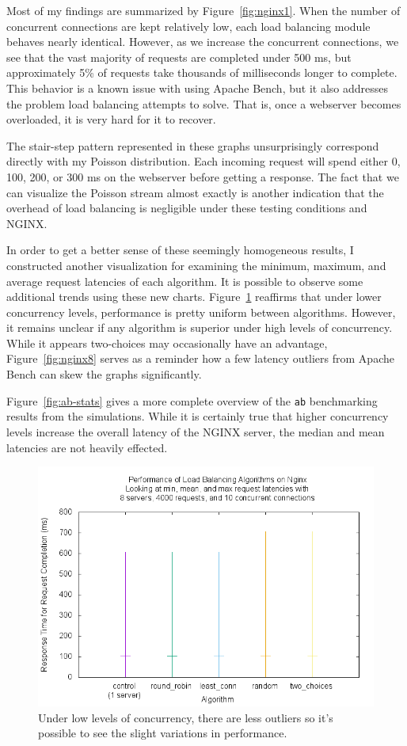 Most of my findings are summarized by Figure~\ref{fig:nginx1}. When
the number of concurrent connections are kept relatively low, each
load balancing module behaves nearly identical. However, as we
increase the concurrent connections, we see that the vast majority of
requests are completed under 500 ms, but approximately 5\% of requests
take thousands of milliseconds longer to complete. This behavior is a
known issue with using Apache Bench, but it also addresses the problem
load balancing attempts to solve. That is, once a webserver becomes
overloaded, it is very hard for it to recover.

The stair-step pattern represented in these graphs unsurprisingly
correspond directly with my Poisson distribution. Each incoming
request will spend either 0, 100, 200, or 300 ms on the webserver
before getting a response. The fact that we can visualize the Poisson
stream almost exactly is another indication that the overhead of load
balancing is negligible under these testing conditions and NGINX.\

In order to get a better sense of these seemingly homogeneous results,
I constructed another visualization for examining the minimum,
maximum, and average request latencies of each algorithm. It is
possible to observe some additional trends using these new charts.
Figure~\ref{fig:nginx2} reaffirms that under lower concurrency levels,
performance is pretty uniform between algorithms. However, it remains
unclear if any algorithm is superior under high levels of concurrency.
While it appears two-choices may occasionally have an advantage,
Figure~\ref{fig:nginx8} serves as a reminder how a few latency
outliers from Apache Bench can skew the graphs significantly.

Figure~\ref{fig:ab-stats} gives a more complete overview of the
\texttt{ab} benchmarking results from the simulations. While it is
certainly true that higher concurrency levels increase the overall
latency of the NGINX server, the median and mean latencies are not
heavily effected.

\begin{figure}
  \includegraphics[width=\linewidth]{figures/ab/stats/10/stats-8.png}
  \caption{Under low levels of concurrency, there are less outliers
    so it's possible to see the slight variations in performance.}
\label{fig:nginx2}
\end{figure}

